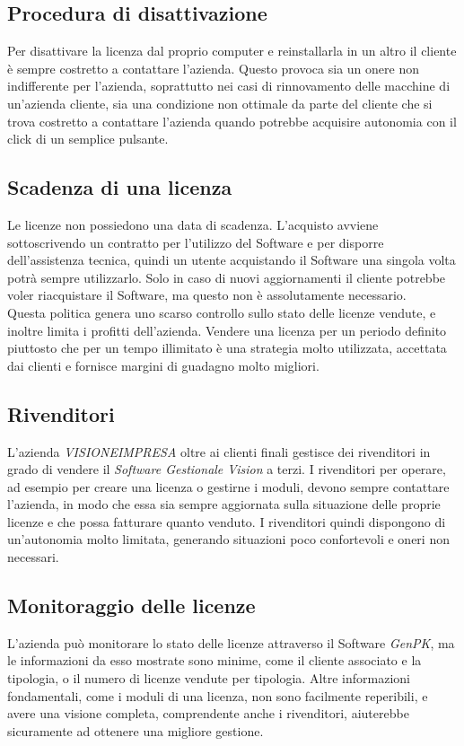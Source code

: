 \subsection{Procedura di disattivazione} 
Per disattivare la licenza dal proprio computer e reinstallarla in un altro il cliente è sempre costretto a contattare l'azienda. Questo provoca sia un onere non indifferente per l'azienda, soprattutto nei casi di rinnovamento delle macchine di un'azienda cliente, sia una condizione non ottimale da parte del cliente che si trova costretto a contattare l'azienda quando potrebbe acquisire autonomia con il click di un semplice pulsante.

\subsection{Scadenza di una licenza} 
Le licenze non possiedono una data di scadenza. L'acquisto avviene sottoscrivendo un contratto per l'utilizzo del Software e per disporre dell'assistenza tecnica, quindi un utente acquistando il Software una singola volta potrà sempre utilizzarlo. Solo in caso di nuovi aggiornamenti il cliente potrebbe voler riacquistare il Software, ma questo non è assolutamente necessario. 
\\Questa politica genera uno scarso controllo sullo stato delle licenze vendute, e inoltre limita i profitti dell'azienda. Vendere una licenza per un periodo definito piuttosto che per un tempo illimitato è una strategia molto utilizzata, accettata dai clienti e fornisce margini di guadagno molto migliori.

\subsection{Rivenditori} 
L'azienda \textit{VISIONEIMPRESA} oltre ai clienti finali gestisce dei rivenditori in grado di vendere il \textit{Software Gestionale Vision} a terzi. 
I rivenditori per operare, ad esempio per creare una licenza o gestirne i moduli, devono sempre contattare l'azienda, in modo che essa sia sempre aggiornata sulla situazione delle proprie licenze e che possa fatturare quanto venduto. I rivenditori quindi dispongono di un'autonomia molto limitata, generando situazioni poco confortevoli e oneri non necessari.

\subsection{Monitoraggio delle licenze}
L'azienda può monitorare lo stato delle licenze attraverso il Software \textit{GenPK}, ma le informazioni da esso mostrate sono minime, come il cliente associato e la tipologia, o il numero di licenze vendute per tipologia. Altre informazioni fondamentali, come i moduli di una licenza, non sono facilmente reperibili, e avere una visione completa, comprendente anche i rivenditori, aiuterebbe sicuramente ad ottenere una migliore gestione.



